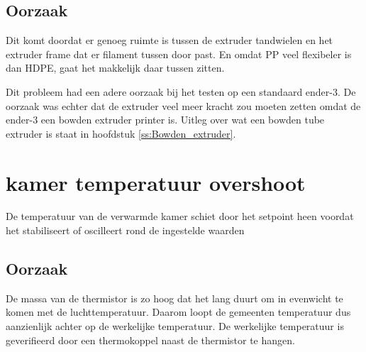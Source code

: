 \subsection{Oorzaak}

Dit komt doordat er genoeg ruimte is tussen de extruder tandwielen en het
extruder frame dat er filament tussen door past. En omdat PP veel flexibeler is
dan HDPE, gaat het makkelijk daar tussen zitten.

Dit probleem had een adere oorzaak bij het testen op een standaard ender-3. De
oorzaak was echter dat de extruder veel meer kracht zou moeten zetten omdat de
ender-3 een bowden extruder printer is. Uitleg over wat een bowden tube
extruder is staat in hoofdstuk \ref{ss:Bowden_extruder}.


\section{kamer temperatuur overshoot}

De temperatuur van de verwarmde kamer schiet door het setpoint heen voordat het
stabiliseert of oscilleert rond de ingestelde waarden

\subsection{Oorzaak}

De massa van de thermistor is zo hoog dat het lang duurt om in evenwicht te
komen met de luchttemperatuur. Daarom loopt de gemeenten temperatuur dus
aanzienlijk achter op de werkelijke temperatuur. De werkelijke temperatuur is
geverifieerd door een thermokoppel naast de thermistor te hangen.